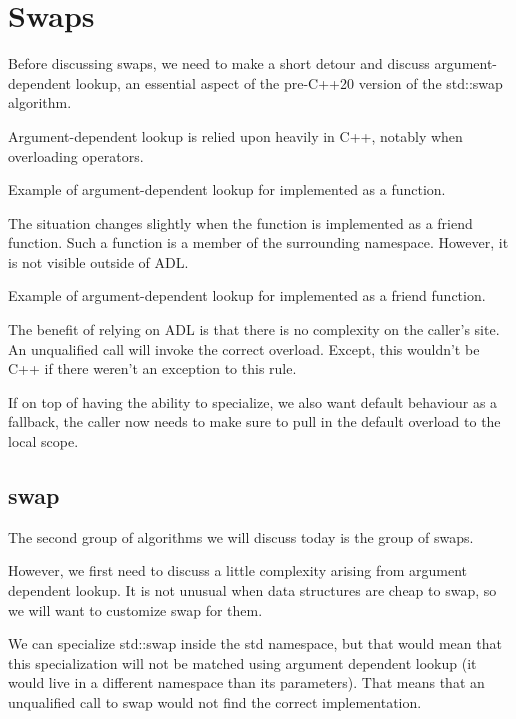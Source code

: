 \section{Swaps}

Before discussing swaps, we need to make a short detour and discuss argument-dependent lookup, an essential aspect of the pre-C++20 version of the std::swap algorithm.

Argument-dependent lookup is relied upon heavily in C++, notably when overloading operators.

\begin{box-note}
\footnotesize Example of argument-dependent lookup for  implemented as a function.
\tcblower
{}
\end{box-note}

The situation changes slightly when the function is implemented as a friend function. Such a function is a member of the surrounding namespace. However, it is not visible outside of ADL.

\begin{box-note}
\footnotesize Example of argument-dependent lookup for  implemented as a friend function.
\tcblower
{}
\end{box-note}

The benefit of relying on ADL is that there is no complexity on the caller's site. An unqualified call will invoke the correct overload. Except, this wouldn't be C++ if there weren't an exception to this rule.

If on top of having the ability to specialize, we also want default behaviour as a fallback, the caller now needs to make sure to pull in the default overload to the local scope.

\subsection{swap}

The second group of algorithms we will discuss today is the group of swaps.


However, we first need to discuss a little complexity arising from argument dependent lookup. It is not unusual when data structures are cheap to swap, so we will want to customize swap for them.

We can specialize std::swap inside the std namespace, but that would mean that this specialization will not be matched using argument dependent lookup (it would live in a different namespace than its parameters). That means that an unqualified call to swap would not find the correct implementation.

